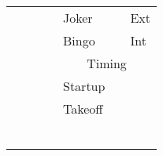 \begin{tabular}{@{}llllllll@{}}
\multicolumn{1}{l|}{}    & \multicolumn{1}{l|}{}     & \multicolumn{1}{l|}{}    & \multicolumn{1}{l|}{}    & \multicolumn{2}{l|}{Joker}                          & \multicolumn{2}{l}{Ext}                              \\ \cmidrule(r){1-4}
\multicolumn{1}{l|}{}    & \multicolumn{1}{l|}{}     & \multicolumn{1}{l|}{}    & \multicolumn{1}{l|}{}    & \multicolumn{2}{l|}{Bingo}                          & \multicolumn{2}{l}{Int}                              \\ \midrule
                         &                           &                          & \multicolumn{1}{l|}{}    & \multicolumn{4}{c|}{Timing}                                                                                \\ \cmidrule(l){5-8} 
                         &                           &                          & \multicolumn{1}{l|}{}    & Startup                  &                          &                           &                          \\
                         &                           &                          & \multicolumn{1}{l|}{}    & Takeoff                  &                          &                           &                          \\
                         &                           &                          & \multicolumn{1}{l|}{}    &                          &                          &                           &                          \\
                         &                           &                          & \multicolumn{1}{l|}{}    &                          &                          &                           &                          \\
                         &                           &                          & \multicolumn{1}{l|}{}    &                          &                          &                           &                          \\
                         &                           &                          & \multicolumn{1}{l|}{}    &                          &                          &                           &                          \\
                         &                           &                          & \multicolumn{1}{l|}{}    &                          &                          &                           &                          \\
                         &                           &                          & \multicolumn{1}{l|}{}    &                          &                          &                           &                          \\ \cmidrule(l){5-8} 
\end{tabular}

